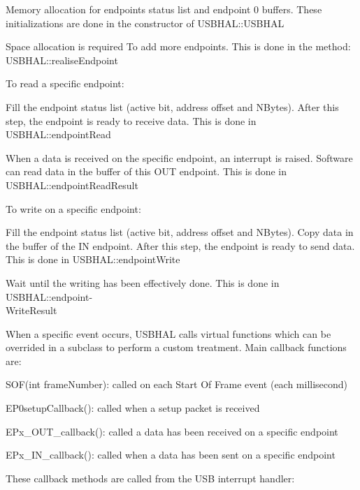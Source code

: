\documentclass[pdftex,10pt,a4paper]{report}
\newenvironment{packed_item}{
\begin{itemize}
  \setlength{\itemsep}{1pt}
  \setlength{\parskip}{0pt}
  \setlength{\parsep}{0pt}
}{\end{itemize}}
\begin{document}
\begin{packed_item}
	\item Memory allocation for endpoints status list and endpoint 0 buffers. These initializations are done in the constructor of USBHAL::USBHAL
	\item Space allocation is required To add more endpoints. This is done in the method: USBHAL::realiseEndpoint
	\item To read a specific endpoint:
		\begin{packed_item}
			\item Fill the endpoint status list (active bit, address offset and NBytes). After this step, the endpoint is ready to receive data. This is done in USBHAL::endpointRead
			\item When a data is received on the specific endpoint, an interrupt is raised. Software can read data in the buffer of this OUT endpoint. This is done in USBHAL::endpointReadResult
		\end{packed_item}
	\item To write on a specific endpoint:
		\begin{packed_item}
			\item Fill the endpoint status list (active bit, address offset and NBytes). Copy data in the buffer of the IN endpoint. After this step, the endpoint is ready to send data. This is done in USBHAL::endpointWrite
			\item Wait until the writing has been effectively done. This is done in USBHAL::endpoint-\\WriteResult
		\end{packed_item}
\end{packed_item}


When a specific event occurs, USBHAL calls virtual functions which can be overrided in a subclass to perform a custom treatment. Main callback functions are:
\begin{packed_item}
	\item SOF(int frameNumber): called on each Start Of Frame event (each millisecond)
	\item EP0setupCallback(): called when a setup packet is received
	\item EPx\_OUT\_callback(): called a data has been received on a specific endpoint
	\item EPx\_IN\_callback(): called when a data has been sent on a specific endpoint
\end{packed_item}

These callback methods are called from the USB interrupt handler:
\end{document}
